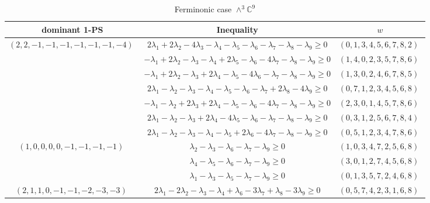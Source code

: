 \documentclass[12pt,landscape]{article}
\begin{document}
 
 \begin{center} 
  \end{center} 
 \begin{longtable}[l]{|c|c|c|} 
 \caption{Ferminonic case $\wedge^{3}\mathbb{C}^{9}$} \\  
 
 \hline 
 \textrm{dominant 1-PS} & \textrm{Inequality} & $w$ \\ 
 \hline\multirow{7}{*}{ $(2 ,2 ,-1 ,-1 ,-1 ,-1 ,-1 ,-1 ,-4) \;$ }  & $2\lambda_{1} + 2\lambda_{2}-4\lambda_{3}-\lambda_{4}-\lambda_{5}-\lambda_{6}-\lambda_{7}-\lambda_{8}-\lambda_{9}\geq 0$ & $(0 ,1 ,3 ,4 ,5 ,6 ,7 ,8 ,2) \;$\\ 
 \cline{2-3} 
 & $-\lambda_{1} + 2\lambda_{2}-\lambda_{3}-\lambda_{4} + 2\lambda_{5}-\lambda_{6}-4\lambda_{7}-\lambda_{8}-\lambda_{9}\geq 0$ & $(1 ,4 ,0 ,2 ,3 ,5 ,7 ,8 ,6) \;$\\ 
 \cline{2-3} 
 & $-\lambda_{1} + 2\lambda_{2}-\lambda_{3} + 2\lambda_{4}-\lambda_{5}-4\lambda_{6}-\lambda_{7}-\lambda_{8}-\lambda_{9}\geq 0$ & $(1 ,3 ,0 ,2 ,4 ,6 ,7 ,8 ,5) \;$\\ 
 \cline{2-3} 
 & $2\lambda_{1}-\lambda_{2}-\lambda_{3}-\lambda_{4}-\lambda_{5}-\lambda_{6}-\lambda_{7} + 2\lambda_{8}-4\lambda_{9}\geq 0$ & $(0 ,7 ,1 ,2 ,3 ,4 ,5 ,6 ,8) \;$\\ 
 \cline{2-3} 
 & $-\lambda_{1}-\lambda_{2} + 2\lambda_{3} + 2\lambda_{4}-\lambda_{5}-\lambda_{6}-4\lambda_{7}-\lambda_{8}-\lambda_{9}\geq 0$ & $(2 ,3 ,0 ,1 ,4 ,5 ,7 ,8 ,6) \;$\\ 
 \cline{2-3} 
 & $2\lambda_{1}-\lambda_{2}-\lambda_{3} + 2\lambda_{4}-4\lambda_{5}-\lambda_{6}-\lambda_{7}-\lambda_{8}-\lambda_{9}\geq 0$ & $(0 ,3 ,1 ,2 ,5 ,6 ,7 ,8 ,4) \;$\\ 
 \cline{2-3} 
 & $2\lambda_{1}-\lambda_{2}-\lambda_{3}-\lambda_{4}-\lambda_{5} + 2\lambda_{6}-4\lambda_{7}-\lambda_{8}-\lambda_{9}\geq 0$ & $(0 ,5 ,1 ,2 ,3 ,4 ,7 ,8 ,6) \;$\\ \hline\multirow{3}{*}{ $(1 ,0 ,0 ,0 ,0 ,-1 ,-1 ,-1 ,-1) \;$ }  & $\lambda_{2}-\lambda_{3}-\lambda_{6}-\lambda_{7}-\lambda_{9}\geq 0$ & $(1 ,0 ,3 ,4 ,7 ,2 ,5 ,6 ,8) \;$\\ 
 \cline{2-3} 
 & $\lambda_{4}-\lambda_{5}-\lambda_{6}-\lambda_{7}-\lambda_{9}\geq 0$ & $(3 ,0 ,1 ,2 ,7 ,4 ,5 ,6 ,8) \;$\\ 
 \cline{2-3} 
 & $\lambda_{1}-\lambda_{3}-\lambda_{5}-\lambda_{7}-\lambda_{9}\geq 0$ & $(0 ,1 ,3 ,5 ,7 ,2 ,4 ,6 ,8) \;$\\ \hline\multirow{8}{*}{ $(2 ,1 ,1 ,0 ,-1 ,-1 ,-2 ,-3 ,-3) \;$ }  & $2\lambda_{1}-2\lambda_{2}-\lambda_{3}-\lambda_{4} + \lambda_{6}-3\lambda_{7} + \lambda_{8}-3\lambda_{9}\geq 0$ & $(0 ,5 ,7 ,4 ,2 ,3 ,1 ,6 ,8) \;$\\ 

\end{longtable}
\end{document}
